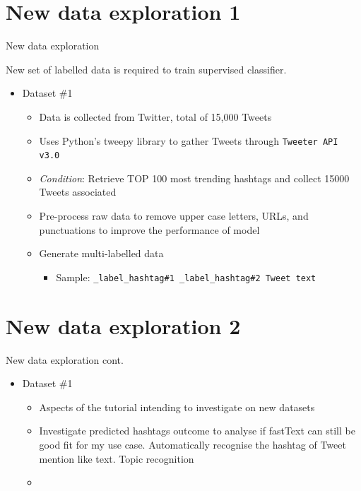 \documentclass[10pt,xcolor={table,dvipsnames},t]{beamer}
\begin{document}
\section{New data exploration 1}
\begin{frame}{New data exploration}

New set of labelled data is required to train supervised classifier.
\newline
    \begin{itemize}
        \item Dataset \#1
            \begin{itemize}
                \item Data is collected from Twitter, total of 15,000 Tweets
                \item Uses Python's \textit{}{tweepy} library to gather Tweets through \texttt{Tweeter API v3.0}
                \item \textit{Condition}: Retrieve TOP 100 most trending hashtags and collect 15000  Tweets associated
                \item Pre-process raw data to remove upper case letters, URLs, and punctuations to improve the performance of model
                \item Generate multi-labelled data
                    \begin{itemize}
                        \item Sample: \texttt{\_label\_hashtag\#1 \_label\_hashtag\#2 Tweet text} 
                    \end{itemize}
            \end{itemize}
    \end{itemize}

\end{frame}

\section{New data exploration 2}
\begin{frame}{New data exploration cont.}

    \begin{itemize}
        \item Dataset \#1
            \begin{itemize}
                \item Aspects of the tutorial intending to investigate on new datasets
                 \item Investigate predicted hashtags outcome to analyse if fastText can still be good fit for my use case.
                    Automatically recognise the hashtag of Tweet mention like text. Topic recognition
                \item 
            \end{itemize}
    \end{itemize}

\end{frame}
\end{document}
